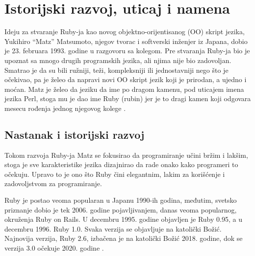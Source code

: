 \documentclass[a4paper]{article}
\begin{document}

\section{Istorijski razvoj, uticaj i namena}
Ideju za stvaranje Ruby-ja kao novog objektno-orijentisanog (OO) skript jezika, Yukihiro “Matz” Matsumoto, njegov tvorac i softverski inženjer iz Japana, dobio je 23. februara 1993. godine u razgovoru sa kolegom. Pre stvaranja Ruby-ja bio je upoznat sa mnogo drugih programskih jezika, ali njima nije bio zadovoljan. Smatrao je da su bili ružniji, teži, kompleksniji ili jednostavniji nego što je očekivao, pa je želeo da napravi novi OO skript jezik koji je prirodan, a ujedno i moćan. Matz je želeo da jeziku da ime po dragom kamenu, pod uticajem imena jezika Perl, stoga mu je dao ime Ruby (rubin) jer je to dragi kamen koji odgovara mesecu rođenja jednog njegovog kolege \cite{rubyTalk}\cite{rubyProgLang}.

\subsection{Nastanak i istorijski razvoj}
 
Tokom razvoja Ruby-ja Matz se fokusirao da programiranje učini bržim i lakšim, stoga je sve karakteristike jezika dizajnirao da rade onako kako programeri to očekuju. Upravo to je ono što Ruby čini elegantnim, lakim za korišćenje i zadovoljstvom za programiranje.

Ruby je postao veoma popularan u Japanu 1990-ih godina, međutim, svetsko priznanje dobio je tek 2006. godine pojavljivanjem, danas veoma popularnog, okruženja Ruby on Rails. U decembru 1995. godine objavljen je Ruby 0.95, a u decembru 1996. Ruby 1.0. Svaka verzija se objavljuje na katolički Božić. Najnovija verzija, Ruby 2.6, izbačena je na katolički Božić 2018. godine, dok se verzija 3.0 očekuje 2020. godine \cite{rubyTalk}\cite{rubyProgLang}.
\end{document}
